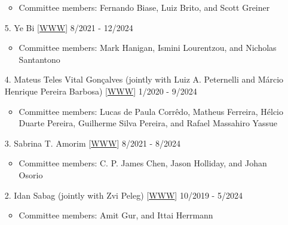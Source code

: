 \documentclass[margin,line,10pt]{res}
\begin{document}
\begin{resume}
\begin{enumerate}
  \begin{itemize}
    \item  Committee members: Fernando Biase, Luiz Brito, and Scott Greiner
   \end{itemize}

  \vspace{0.3cm}

  \item [5.] Ye Bi [\textcolor{blue}{\href{https://yebigithub.github.io}{WWW}}]  \hfill  8/2021 - 12/2024

  \begin{itemize}
    \item  Committee members: Mark Hanigan, Ismini Lourentzou, and Nicholas Santantono 
   \end{itemize}

    \vspace{0.3cm}
    
    \item [4.] Mateus Teles Vital Gon\c calves (jointly with Luiz A. Peternelli and M\'{a}rcio Henrique Pereira Barbosa) [\textcolor{blue}{\href{https://goncalvesmateu.github.io/}{WWW}}]  \hfill  1/2020 - 9/2024 

    \begin{itemize}
      \item  Committee members: Lucas de Paula Corr\^{e}do, Matheus Ferreira, H\'{e}lcio Duarte Pereira, Guilherme Silva Pereira, and Rafael Massahiro Yassue
     \end{itemize}

  \vspace{0.3cm}

   \item [3.] Sabrina T. Amorim [\textcolor{blue}{\href{https://sabrinaam.github.io/}{WWW}}]  \hfill  8/2021 - 8/2024

   \begin{itemize}
    \item  Committee members: C. P. James Chen, Jason Holliday, and Johan Osorio 
   \end{itemize}

     \vspace{0.3cm}
    
  \item [2.] Idan Sabag (jointly with Zvi Peleg) [\textcolor{blue}{\href{https://twitter.com/idansabag7}{WWW}}]  \hfill  10/2019 - 5/2024

    \begin{itemize}
     \item  Committee members: Amit Gur, and Ittai Herrmann 
    \end{itemize}
    

\end{enumerate}
\end{resume}
\end{document}
